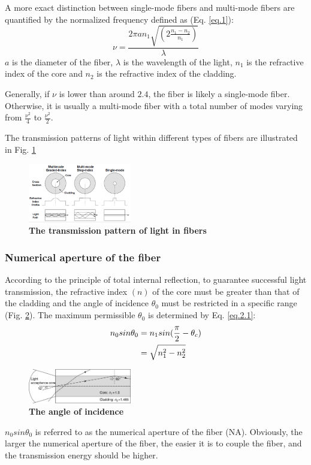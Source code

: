 \documentclass[10pt,a4paper,twocolumn,twoside,UTF8]{article}
\begin{document}
		A more exact distinction between single-mode fibers and multi-mode fibers are quantified by the normalized frequency defined as (Eq. \ref{eq.1}):
		\begin{equation}
			\nu = \frac{2\pi a n_1\sqrt{(2\frac{n_1-n_2}{n_1})}}{\lambda}
			\label{eq.1}
		\end{equation}
		$a$ is the diameter of the fiber, $\lambda$ is the wavelength of the light, $n_1$ is the refractive index of the core and $n_2$ is the refractive index of the cladding.
		
		Generally, if $\nu$ is lower than around $2.4$, the fiber is likely a single-mode fiber. Otherwise, it is usually a multi-mode fiber with a total number of modes varying from $\frac{\nu^2}{4}$ to $\frac{\nu^2}{2}$.
		
		The transmission patterns of light within different types of fibers are illustrated in Fig. \ref{fig.illus-1.2}
		\begin{figure}[htbp]
			\centering
			\includegraphics[width=0.4\textwidth]{attachments/illus-1.2.png}
			\caption{\textbf{The transmission pattern of light in fibers}}
			\label{fig.illus-1.2}
		\end{figure}

		\subsubsection{Numerical aperture of the fiber}
		According to the principle of total internal reflection, to guarantee successful light transmission, 
		the refractive index $(n)$ of the core must be greater than that of the cladding and the angle of incidence $\theta_0$ must be restricted in a specific range (Fig. \ref{fig.illus-2.1}). 
		The maximum permissible $\theta_0$ is determined by Eq. \ref{eq.2.1}:
		\begin{align}
			n_0sin\theta_0 &= n_1sin(\frac{\pi}{2} - \theta_c) \notag \\
			&= \sqrt{n_1^2-n_2^2}
			\label{eq.2.1}
		\end{align}
		\begin{figure}[htbp]
			\centering
			\includegraphics[width=0.4\textwidth]{attachments/illus-2.1.png}
			\caption{\textbf{The angle of incidence}}
			\label{fig.illus-2.1}
		\end{figure}
		$n_0sin\theta_0$ is referred to as the numerical aperture of the fiber (NA). Obviously, the larger the numerical aperture of the fiber, the easier it is to couple the fiber, and the transmission energy should be higher.
		
\end{document}
